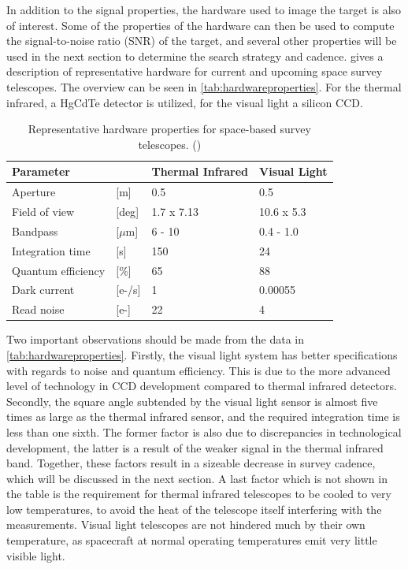 In addition to the signal properties, the hardware used to image the target is also of interest. Some of the properties of the hardware can then be used to compute the signal-to-noise ratio (SNR) of the target, and several other properties will be used in the next section to determine the search strategy and cadence. \cite{2017NEOSDT} gives a description of representative hardware for current and upcoming space survey telescopes. The overview can be seen in \autoref{tab:hardwareproperties}. For the thermal infrared, a HgCdTe detector is utilized, for the visual light a silicon CCD. \\

\begin{table}[htbp]
\centering
\caption{Representative hardware properties for space-based survey telescopes. (\cite{2017NEOSDT})}
\label{tab:hardwareproperties}
\begin{tabular}{ll|ll}
\textbf{Parameter}        &  & \textbf{Thermal Infrared} & \textbf{Visual Light} \\ \hline
Aperture &{[}m{]}            & 0.5                       & 0.5                   \\
Field of view &{[}deg{]}     & 1.7 x 7.13                & 10.6 x 5.3            \\
Bandpass &{[}$\mu$m{]}       & 6 - 10                    & 0.4 - 1.0             \\
Integration time &{[}s{]}    & 150                       & 24                    \\
Quantum efficiency &{[}\%{]} & 65                        & 88                    \\
Dark current &{[}e-/s{]}     & 1                         & 0.00055               \\
Read noise &{[}e-{]}         & 22                        & 4
\end{tabular}
\end{table}

Two important observations should be made from the data in \autoref{tab:hardwareproperties}. Firstly, the visual light system has better specifications with regards to noise and quantum efficiency. This is due to the more advanced level of technology in CCD development compared to thermal infrared detectors. Secondly, the square angle subtended by the visual light sensor is almost five times as large as the thermal infrared sensor, and the required integration time is less than one sixth. The former factor is also due to discrepancies in technological development, the latter is a result of the weaker signal in the thermal infrared band. Together, these factors result in a sizeable decrease in survey cadence, which will be discussed in the next section. A last factor which is not shown in the table is the requirement for thermal infrared telescopes to be cooled to very low temperatures, to avoid the heat of the telescope itself interfering with the measurements. Visual light telescopes are not hindered much by their own temperature, as spacecraft at normal operating temperatures emit very little visible light. \\

